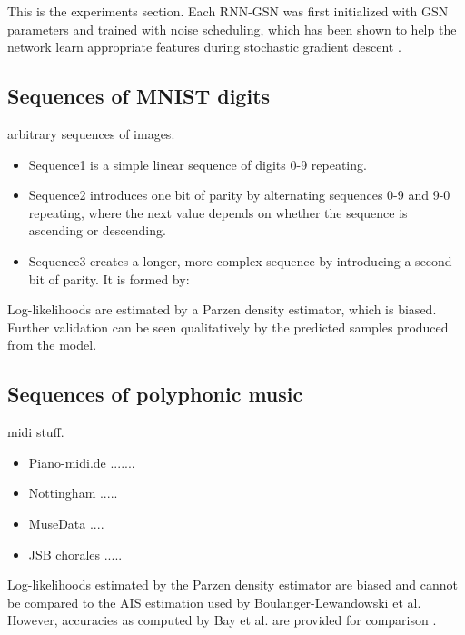 This is the experiments section.
Each RNN-GSN was first initialized with GSN parameters and trained with noise scheduling, which has been shown to help the network learn appropriate features during stochastic gradient descent \cite{noise_schedule}.
\subsection{Sequences of MNIST digits}
	arbitrary sequences of images.
	\begin{itemize}
		\item Sequence1 is a simple linear sequence of digits 0-9 repeating.
		\item Sequence2 introduces one bit of parity by alternating sequences 0-9 and 9-0 repeating, where the next value depends on whether the sequence is ascending or descending.
		\item Sequence3 creates a longer, more complex sequence by introducing a second bit of parity. It is formed by:
	\end{itemize}
	
Log-likelihoods are estimated by a Parzen density estimator, which is biased. Further validation can be seen qualitatively by the predicted samples produced from the model.

\subsection{Sequences of polyphonic music}
	midi stuff.
	\begin{itemize}
		\item Piano-midi.de .......
		\item Nottingham .....
		\item MuseData ....
		\item JSB chorales .....
	\end{itemize}
	
Log-likelihoods estimated by the Parzen density estimator are biased and cannot be compared to the AIS estimation used by Boulanger-Lewandowski et al. However, accuracies as computed by Bay et al. are provided for comparison \cite{bay}.